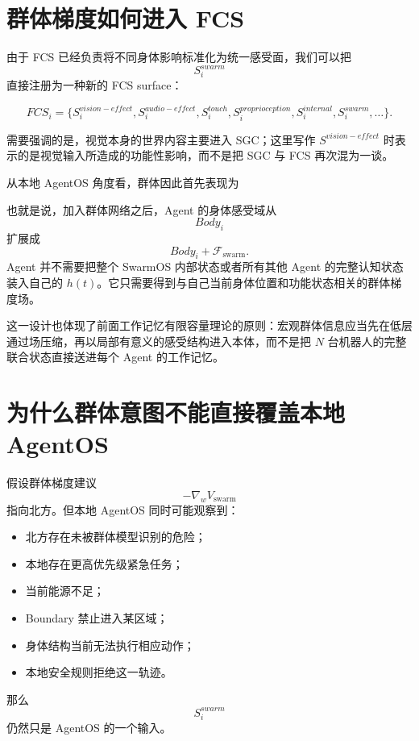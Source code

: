 \section{群体梯度如何进入 FCS}

由于 FCS 已经负责将不同身体影响标准化为统一感受面，我们可以把
\[
S_i^{swarm}
\]
直接注册为一种新的 FCS surface：

\[
FCS_i
=
\{
S_i^{vision-effect},
S_i^{audio-effect},
S_i^{touch},
S_i^{proprioception},
S_i^{internal},
S_i^{swarm},
\ldots
\}.
\]

需要强调的是，视觉本身的世界内容主要进入 SGC；这里写作 $S^{vision-effect}$ 时表示的是视觉输入所造成的功能性影响，而不是把 SGC 与 FCS 再次混为一谈。

从本地 AgentOS 角度看，群体因此首先表现为
\begin{statementbox}
\centering
{}
\end{statementbox}

也就是说，加入群体网络之后，Agent 的身体感受域从
\[
Body_i
\]
扩展成
\[
Body_i
+
\mathcal F_{\mathrm{swarm}}.
\]
Agent 并不需要把整个 SwarmOS 内部状态或者所有其他 Agent 的完整认知状态装入自己的 $h(t)$。它只需要得到与自己当前身体位置和功能状态相关的群体梯度场。

这一设计也体现了前面工作记忆有限容量理论的原则：宏观群体信息应当先在低层通过场压缩，再以局部有意义的感受结构进入本体，而不是把 $N$ 台机器人的完整联合状态直接送进每个 Agent 的工作记忆。


\section{为什么群体意图不能直接覆盖本地 AgentOS}

假设群体梯度建议
\[
-\nabla_wV_{\mathrm{swarm}}
\]
指向北方。但本地 AgentOS 同时可能观察到：

\begin{itemize}
    \item 北方存在未被群体模型识别的危险；
    \item 本地存在更高优先级紧急任务；
    \item 当前能源不足；
    \item Boundary 禁止进入某区域；
    \item 身体结构当前无法执行相应动作；
    \item 本地安全规则拒绝这一轨迹。
\end{itemize}

那么
\[
S_i^{swarm}
\]
仍然只是 AgentOS 的一个输入。

